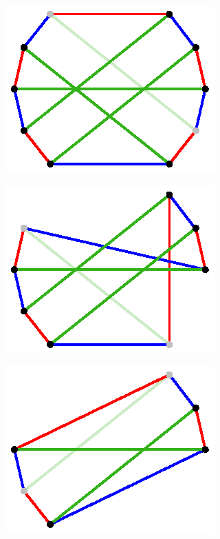 \documentclass[11pt, oneside]{amsart}
\theoremstyle{theorem}
\theoremstyle{definition}
\theoremstyle{theorem}
\begin{document}
\begin{figure}[h!]
\begin{subfigure}{.24\textwidth}
  \label{nx2}
\end{subfigure}
\begin{subfigure}{.24\textwidth}
  \centering
  \includegraphics[width=.9\linewidth]{nonex3.eps}
  \label{nx3}
\end{subfigure}%
\begin{subfigure}{.24\textwidth}
  \centering
  \includegraphics[width=.9\linewidth]{nonex4.eps}
  \label{nx4}
\end{subfigure}
\begin{subfigure}{.24\textwidth}
  \centering
  \includegraphics[width=.9\linewidth]{nonex5.eps}

\end{subfigure}
\end{figure}
\end{document}
